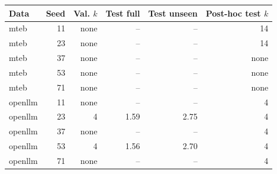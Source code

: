 \begin{tabular}{lrrrrr}
\toprule
Data & Seed & Val. $k$ & Test full & Test unseen & Post-hoc test $k$ \\
\midrule
mteb & 11 & none & -- & -- & 14 \\
mteb & 23 & none & -- & -- & 14 \\
mteb & 37 & none & -- & -- & none \\
mteb & 53 & none & -- & -- & none \\
mteb & 71 & none & -- & -- & none \\
openllm & 11 & none & -- & -- & 4 \\
openllm & 23 & 4 & 1.59 & 2.75 & 4 \\
openllm & 37 & none & -- & -- & 4 \\
openllm & 53 & 4 & 1.56 & 2.70 & 4 \\
openllm & 71 & none & -- & -- & 4 \\
\bottomrule
\end{tabular}
